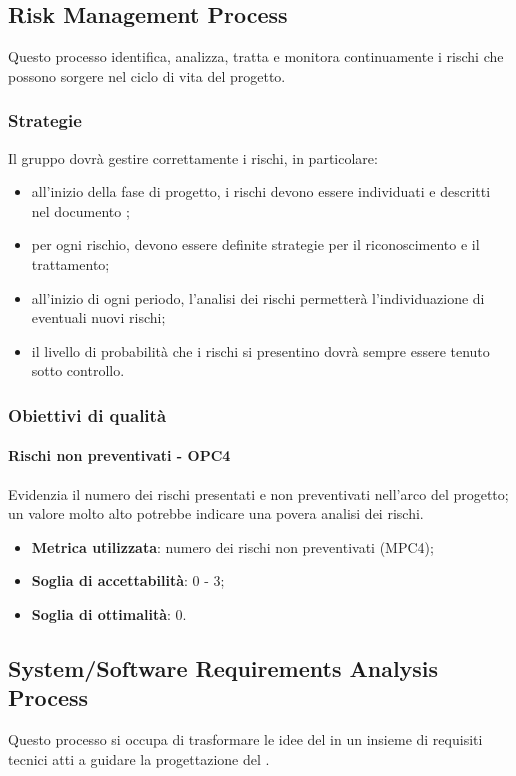 \documentclass[PdQ.tex]{subfiles}
\begin{document}
	\subsection{Risk Management Process}
		Questo processo identifica, analizza, tratta e monitora continuamente i rischi che possono sorgere nel ciclo di vita del progetto.
		
		\subsubsection{Strategie}
			Il gruppo dovrà gestire correttamente i rischi, in particolare:
			\begin{itemize}
				\item all'inizio della fase di progetto, i rischi devono essere individuati e descritti nel documento \PPdocRP{};
				\item per ogni rischio, devono essere definite strategie per il riconoscimento e il trattamento;
				\item all'inizio di ogni periodo, l'analisi dei rischi permetterà l'individuazione di eventuali nuovi rischi;
				\item il livello di probabilità che i rischi si presentino dovrà sempre essere tenuto sotto controllo.
			\end{itemize}
			
		\subsubsection{Obiettivi di qualità}
			\paragraph{Rischi non preventivati - OPC4}
				Evidenzia il numero dei rischi presentati e non preventivati nell'arco del progetto; un valore molto alto potrebbe indicare una povera analisi dei rischi.
				\begin{itemize}
					\item \textbf{Metrica utilizzata}: numero dei rischi non preventivati (MPC4);
					\item \textbf{Soglia di accettabilità}: 0 - 3;
					\item \textbf{Soglia di ottimalità}: 0.
				\end{itemize}

	\subsection{System/Software Requirements Analysis Process}
		Questo processo si occupa di trasformare le idee del  in un insieme di requisiti tecnici atti a guidare la progettazione del .
		
\end{document}
